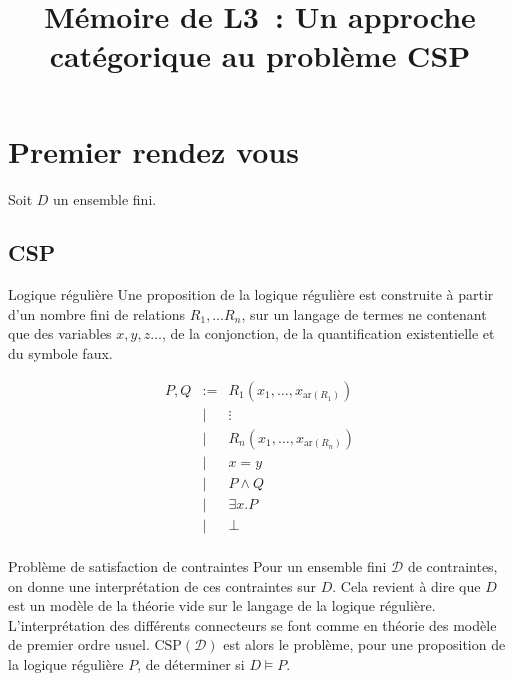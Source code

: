 \documentclass[12pt]{article}
\title{Mémoire de L3~: Un approche catégorique au problème CSP}
\author{}
\newcommand\ar{\text{ar}}
\newcommand\csp{\text{CSP}}
\begin{document}
\maketitle

\section{Premier rendez vous}

Soit $D$ un ensemble fini.

\subsection{CSP}

\begin{defi}{Logique régulière}
    Une proposition de la logique régulière est construite à partir d'un nombre
    fini de relations $R_1, \dots R_n$, sur un langage de termes ne contenant que
    des variables $x, y, z \dots$, de la conjonction, de la quantification existentielle
    et du symbole faux.

    \[\begin{array}{rcl}
        P, Q & := & R_1(x_1, \dots, x_{\ar(R_1)}) \\
             & |  & \vdots                        \\
             & |  & R_n(x_1, \dots, x_{\ar(R_n)}) \\
             & |  & x = y                         \\
             & |  & P \wedge Q                    \\
             & |  & \exists x. P                  \\
             & |  & \bot                          \\
    \end{array}\]
\end{defi}

\begin{defi}{Problème de satisfaction de contraintes}
    Pour un ensemble fini $\mathcal{D}$ de contraintes, on donne une interprétation de
    ces contraintes sur $D$. Cela revient à dire que $D$ est un modèle de la théorie
    vide sur le langage de la logique régulière. L'interprétation des différents 
    connecteurs se font comme en théorie des modèle de premier ordre usuel. 
    $\csp(\mathcal{D})$ est alors le problème, pour une proposition de la logique
    régulière $P$, de déterminer si $D\models P$.
\end{defi}
\end{document}
